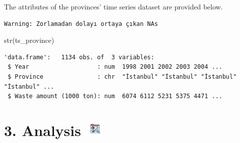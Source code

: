 \documentclass[
  11pt,
  a4paper,
  DIV=11,
  numbers=noendperiod]{scrartcl}
\newenvironment{Shaded}{\begin{snugshade}}{\end{snugshade}}
\newcommand{\AttributeTok}[1]{\textcolor[rgb]{0.40,0.45,0.13}{#1}}
\newcommand{\FunctionTok}[1]{\textcolor[rgb]{0.28,0.35,0.67}{#1}}
\newcommand{\NormalTok}[1]{\textcolor[rgb]{0.00,0.23,0.31}{#1}}
\newcommand{\OtherTok}[1]{\textcolor[rgb]{0.00,0.23,0.31}{#1}}
\newcommand{\SpecialCharTok}[1]{\textcolor[rgb]{0.37,0.37,0.37}{#1}}
\newcommand{\StringTok}[1]{\textcolor[rgb]{0.13,0.47,0.30}{#1}}
\begin{document}
The attributes of the provinces' time series dataset are provided below.

\begin{Shaded}
\end{Shaded}

\begin{verbatim}
Warning: Zorlamadan dolayı ortaya çıkan NAs
\end{verbatim}

\begin{Shaded}
\begin{Highlighting}[]
\FunctionTok{str}\NormalTok{(ts\_province)}
\end{Highlighting}
\end{Shaded}

\begin{verbatim}
'data.frame':   1134 obs. of  3 variables:
 $ Year                   : num  1998 2001 2002 2003 2004 ...
 $ Province               : chr  "İstanbul" "İstanbul" "İstanbul" "İstanbul" ...
 $ Waste amount (1000 ton): num  6074 6112 5231 5375 4471 ...
\end{verbatim}

\section[{3. Analysis} ]{\texorpdfstring{{3. Analysis}
\protect\includegraphics[width=0.375in,height=0.30208in]{assets/images/analysis.jpg}}{3. Analysis }}\label{analysis}
\end{document}

